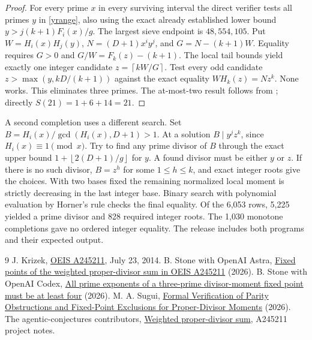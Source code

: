 \documentclass[11pt]{article}
\newcommand{\fl}[1]{\left\lfloor #1\right\rfloor}
\newcommand{\ceil}[1]{\left\lceil #1\right\rceil}
\begin{document}
\begin{proof}
For every prime $x$ in every surviving interval the direct verifier tests all primes $y$ in \eqref{yrange}, also using the exact already established lower bound $y>j(k+1)F_i(x)/g$. The largest sieve endpoint is $48{,}554{,}105$. Put $W=H_i(x)H_j(y)$, $N=(D+1)x^iy^j$, and $G=N-(k+1)W$. Equality requires $G>0$ and $G/W=F_k(z)-(k+1)$. The local tail bounds yield exactly one integer candidate $z=\ceil{kW/G}$. Test every odd candidate $z>\max(y,kD/(k+1))$ against the exact equality $W H_k(z)=Nz^k$. None works. This eliminates three primes. The at-most-two result follows from \cite{first}; directly $S(21)=1+6+14=21$.
\end{proof}

A second completion uses a different search. Set $B=H_i(x)/\gcd(H_i(x),D+1)>1$. At a solution $B\mid y^j z^k$, since $H_i(x)\equiv1\pmod x$. Try to find any prime divisor of $B$ through the exact upper bound $1+\fl{2(D+1)/g}$ for $y$. A found divisor must be either $y$ or $z$. If there is no such divisor, $B=z^h$ for some $1\le h\le k$, and exact integer roots give the choices. With two bases fixed the remaining normalized local moment is strictly decreasing in the last integer base. Binary search with polynomial evaluation by Horner's rule checks the final equality. Of the 6,053 rows, 5,225 yielded a prime divisor and 828 required integer roots. The 1,030 monotone completions gave no ordered integer equality. The release includes both programs and their expected output.\par
\small\begin{thebibliography}{9}
 J. Krizek, \href{https://oeis.org/A245211}{OEIS A245211}, July 23, 2014.
 B. Stone with OpenAI Astra, \href{https://github.com/blakestone-x/math/blob/a80ee14b88981065189113eace98e1b8fba58c28/A245211/A245211-research.pdf}{Fixed points of the weighted proper-divisor sum in OEIS A245211} (2026).
 B. Stone with OpenAI Codex, \href{https://github.com/blakestone-x/math/blob/5a9d2730dd28ae3031c488960ae2f6cd08a36803/A245211/simple-prime.pdf}{All prime exponents of a three-prime divisor-moment fixed point must be at least four} (2026).
 M. A. Sugui, \href{https://doi.org/10.5281/zenodo.24437886}{Formal Verification of Parity Obstructions and Fixed-Point Exclusions for Proper-Divisor Moments} (2026).
 The agentic-conjectures contributors, \href{https://github.com/umaia1234/agentic-conjectures/blob/78a56edb19eadb6a23f5f791273f016e0b3e0f50/problems/oeis-a245211/DETAILS.md}{Weighted proper-divisor sum}, A245211 project notes.
\end{thebibliography}
\end{document}
